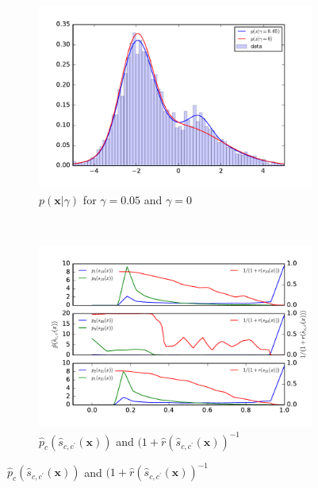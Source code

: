 \documentclass[12pt]{article}
\numberwithin{equation}{section}
\theoremstyle{plain}
\begin{document}
\begin{figure}
    \centering
    \begin{subfigure}[b]{0.4\textwidth}
        \includegraphics[clip, trim=0.5cm 0.5cm 0.5cm 0.5cm, width=\textwidth]{figures/fig1a.pdf}
        \caption{$p(\mathbf{x}|\gamma)$  for $\gamma=0.05$ and $\gamma=0$}
        \label{fig:1a}
    \end{subfigure}
    ~
    \begin{subfigure}[b]{0.4\textwidth}
        \includegraphics[clip, trim=0.5cm 0.5cm 0.5cm 0.5cm,width=\textwidth]{figures/fig1b.pdf}
        \caption{$\hat{p}_c(\hat{s}_{c,c^\prime}(\mathbf{x}) )$ and $(1+\hat{r}(\hat{s}_{c,c^\prime}(\mathbf{x}))^{-1}$}
        \label{fig:p_sij}
    \end{subfigure}

    \vspace{1em}


\end{figure}
\end{document}
